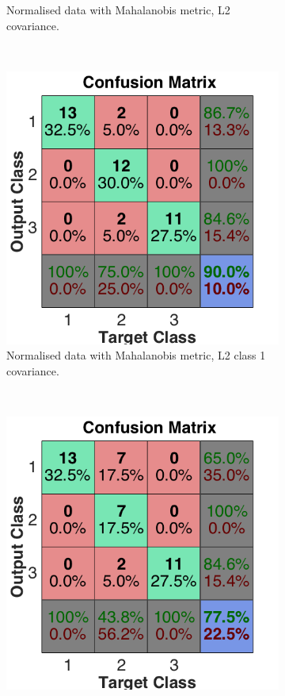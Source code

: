 \documentclass[a4paper, 10pt, conference]{ieeeconf}
\begin{document}
\begin{figure}[!ht]
\begin{subfigure}{0.32\textwidth}
      \caption{Normalised data with Mahalanobis metric, L2 covariance.}
    \end{subfigure}
    \\
    \begin{subfigure}{0.32\textwidth}
      \includegraphics[width=\textwidth]{pic/mod_cov_l2_class1.png}
      \caption{Normalised data with Mahalanobis metric, L2 class 1 covariance.}
    \end{subfigure}
    ~
    \begin{subfigure}{0.32\textwidth}
      \includegraphics[width=\textwidth]{pic/mod_cov_l2_class2.png}

\end{subfigure}
\end{figure}
\end{document}
